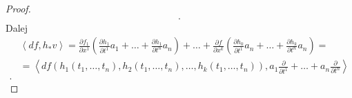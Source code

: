 \documentclass[../main.tex]{subfiles}
\begin{document}
\begin{proof}
\begin{align*}
        .\end{align*}
        Dalej
        \begin{align*}
            &\left<df,h_*v \right> = \frac{\partial f_1}{\partial x^1} \left( \frac{\partial h_1}{\partial t^1} a_1 + \ldots + \frac{\partial h_1}{\partial t^n} a_n \right)  + \ldots + \frac{\partial f}{\partial x^k} \left( \frac{\partial h_k}{\partial t^1} a_n + \ldots + \frac{\partial h_k}{\partial t^n} a_n \right) =\\
            &= \left<df(h_1(t_1,\ldots,t_n),h_2(t_1,\ldots,t_n),\ldots,h_k(t_1,\ldots,t_n)), a_1 \frac{\partial }{\partial t^1} + \ldots + a_n \frac{\partial }{\partial t^n}  \right> \\
        .\end{align*}
    \end{proof}
\end{document}
